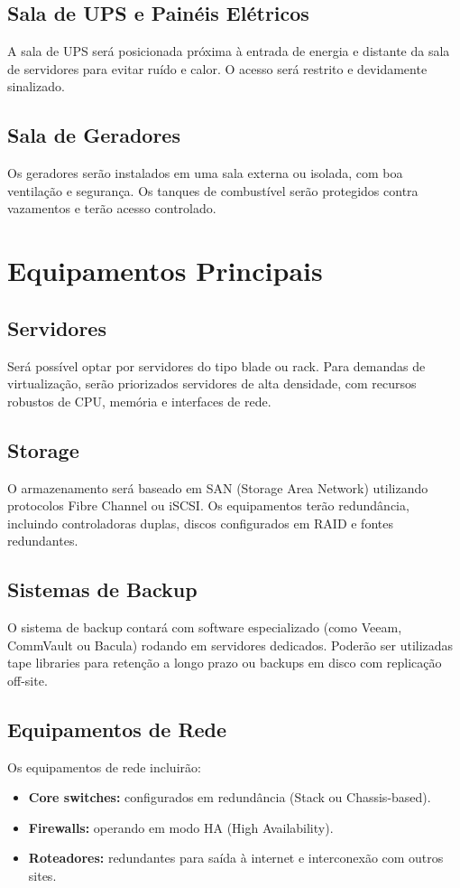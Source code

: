 \documentclass[
	12pt,				%
	oneside,			%
	a4paper,			%
	english,			%
	brazil				%
	]{abntex2unama}
\begin{document}
\subsection{Sala de UPS e Painéis Elétricos}
A sala de UPS será posicionada próxima à entrada de energia e distante da sala de servidores para evitar ruído e calor. O acesso será restrito e devidamente sinalizado.

\subsection{Sala de Geradores}
Os geradores serão instalados em uma sala externa ou isolada, com boa ventilação e segurança. Os tanques de combustível serão protegidos contra vazamentos e terão acesso controlado.

\section{Equipamentos Principais}
\subsection{Servidores}
Será possível optar por servidores do tipo blade ou rack. Para demandas de virtualização, serão priorizados servidores de alta densidade, com recursos robustos de CPU, memória e interfaces de rede.

\subsection{Storage}
O armazenamento será baseado em SAN (Storage Area Network) utilizando protocolos Fibre Channel ou iSCSI. Os equipamentos terão redundância, incluindo controladoras duplas, discos configurados em RAID e fontes redundantes.

\subsection{Sistemas de Backup}
O sistema de backup contará com software especializado (como Veeam, CommVault ou Bacula) rodando em servidores dedicados. Poderão ser utilizadas tape libraries para retenção a longo prazo ou backups em disco com replicação off-site.

\subsection{Equipamentos de Rede}
Os equipamentos de rede incluirão:
\begin{itemize}
	\item \textbf{Core switches:} configurados em redundância (Stack ou Chassis-based).
	\item \textbf{Firewalls:} operando em modo HA (High Availability).
	\item \textbf{Roteadores:} redundantes para saída à internet e interconexão com outros sites.
\end{itemize}
\end{document}
